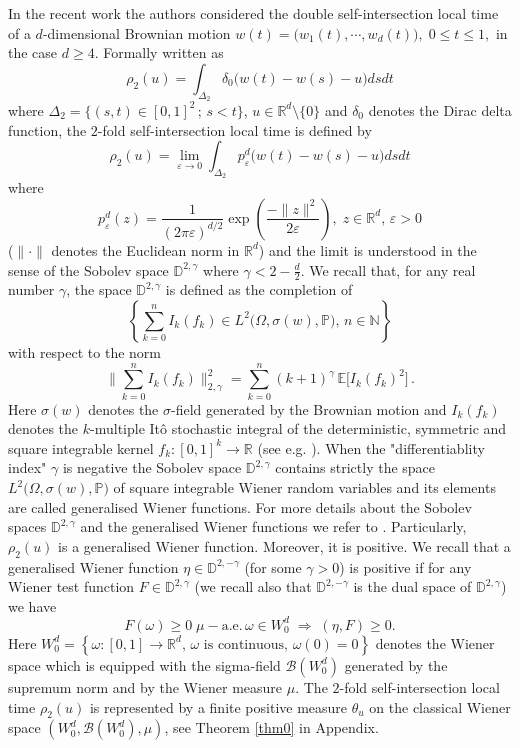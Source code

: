\documentclass[]{interact}
\newcommand{\E}{{\mathbb{E}}}
\newcommand{\R}{{\mathbb{R}}}
\newcommand{\D}{{\mathbb{D}}}
\newcommand{\1}{\mathbf{1}}
\newcommand{\N}{{\mathbb N}}
\newcommand{\ve}{\varepsilon}
\theoremstyle{plain}%
\theoremstyle{definition}
\theoremstyle{remark}
\begin{document}
In the recent work \cite{DS23} the authors considered the double self-intersection local time of a $d$-dimensional Brownian motion $w(t)=\big( w_1(t),\cdots,w_d(t)\big),\; 0\leqslant t\leqslant 1,$ in the case $d\geqslant 4$. Formally written as
\begin{equation}
\label{example1}
\rho_2(u)=\int _{\Delta_2} \delta_0 \big(w(t)-w(s)-u \big)  dsdt 
\end{equation} 
where $\Delta_2= \{ (s,t)\in [0,1]^2\, ;\, s<t\}$, $u\in \R^d\setminus\{0\}$ and $\delta_0$ denotes the Dirac delta function, the $2$-fold self-intersection local time is defined by
$$ \rho_2 (u)=\lim_{\varepsilon \to 0} \int_{\Delta_2  }  p^d_{\varepsilon}\big( w(t)-w(s)-u\big)dsdt   $$
where 
$$ p^d_{\ve}(z)=\frac{1}{ (2\pi \ve)^{d/2} } \exp \left( \frac{-\|z\|^2}{2\ve} \right),\; z\in \R^d,\, \ve >0
$$
($\|\cdot\|$ denotes the Euclidean norm in $\R^d$) and the limit is understood in the sense of the Sobolev space $\D^{2,\gamma}$ where $\gamma < 2-\frac{d}{2}$. We recall that, for any real number $\gamma$, the space $\D^{2,\gamma}$ is defined as the completion of 
$$ \left\lbrace   \sum_{k=0}^n I_k (f_k) \in L^2\big( \Omega, \sigma(w),\mathbb{P}\big),\, n\in \N\right\rbrace  $$
with respect to the norm  
$$ \Big \| \sum_{k=0}^n I_k (f_k)\Big \| _{2,\gamma} ^2=\sum_{k=0}^{n} (k+1)^{\gamma } \, \E \big[ I_k(f_k)^2 \big] \,.  $$
Here $\sigma(w)$ denotes the $\sigma$-field generated by the Brownian motion and $I_k(f_k)$ denotes the $k$-multiple It\^{o} stochastic integral of the deterministic, symmetric and square integrable kernel $f_k :[0,1]^k \to \R$ (see e.g. \cite{IPV95}). When the "differentiablity index" $\gamma$ is negative the Sobolev space $\D^{2,\gamma}$ contains strictly the space $L^2\big( \Omega, \sigma(w),\mathbb{P}\big)$ of square integrable Wiener random variables and its elements are called generalised Wiener functions. For more details about the Sobolev spaces $\D^{2,\gamma}$ and the generalised Wiener functions we refer to \cite{Mall97, Su88}. Particularly, $\rho_2(u)$ is a generalised Wiener function. Moreover, it is positive. We recall that a generalised Wiener function $\eta \in \D^{2,-\gamma}$ (for some $\gamma >0$) is positive if for any Wiener test function $F\in \D^{2,\gamma}$ (we recall also that $\D^{2,-\gamma}$ is the dual space of $\D^{2,\gamma}$) we have 
$$ F(\omega) \geqslant 0 \;\mu-\text{a.e.} \, \omega \in W_0^d \; \Rightarrow \; (\eta, F)\geqslant 0. $$
Here $ W_0^d=\left\lbrace \omega :[0,1]\to \R^d,\, \omega \text{ is continuous},\, \omega(0)=0\right\rbrace  $ denotes the Wiener space which is equipped with the sigma-field $ \mathcal{B}(W_0^d) $ generated by the supremum norm and by the Wiener measure  $\mu$. The $2$-fold self-intersection local time $\rho_2(u)$ is represented by a finite positive measure $\theta_u$ on the classical Wiener space $(W_0^d,\mathcal{B}(W_0^d),\mu)$, see Theorem \ref{thm0} in Appendix.\\
\end{document}
